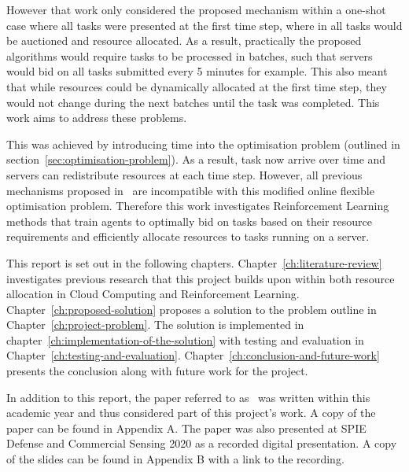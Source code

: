 However that work only considered the proposed mechanism within a one-shot case where all tasks were presented
at the first time step, where in all tasks would be auctioned and resource allocated. As a result, practically the proposed
algorithms would require tasks to be processed in batches, such that servers would bid on all tasks submitted every 5
minutes for example. This also meant that while resources could be dynamically allocated at the first time step, they
would not change during the next batches until the task was completed. This work aims to address these problems.

This was achieved by introducing time into the optimisation problem (outlined in section~\ref{sec:optimisation-problem}).
As a result, task now arrive over time and servers can redistribute resources at each time step. However, all
previous mechanisms proposed in~\cite{FlexibleResourceAllocation} are incompatible with this modified online flexible
optimisation problem. Therefore this work investigates Reinforcement Learning methods that train agents to optimally
bid on tasks based on their resource requirements and efficiently allocate resources to tasks running on a server.

This report is set out in the following chapters. Chapter~\ref{ch:literature-review} investigates previous research
that this project builds upon within both resource allocation in Cloud Computing and Reinforcement Learning.
Chapter~\ref{ch:proposed-solution} proposes a solution to the problem outline in Chapter~\ref{ch:project-problem}.
The solution is implemented in chapter~\ref{ch:implementation-of-the-solution} with testing and
evaluation in Chapter~\ref{ch:testing-and-evaluation}.
Chapter~\ref{ch:conclusion-and-future-work} presents the conclusion along with future work for the project.

In addition to this report, the paper referred to as~\cite{FlexibleResourceAllocation} was written within this
academic year and thus considered part of this project's work. A copy of the paper can be found in
Appendix A. The paper was also presented at SPIE Defense and Commercial Sensing 2020 as a recorded digital presentation.
A copy of the slides can be found in Appendix B with a link to the recording.
